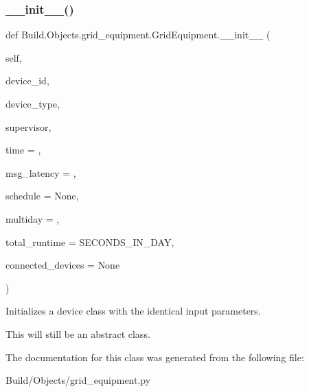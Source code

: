 \subsubsection{\texorpdfstring{\+\_\+\+\_\+init\+\_\+\+\_\+()}{\_\_init\_\_()}}
{\footnotesize\ttfamily def Build.\+Objects.\+grid\+\_\+equipment.\+Grid\+Equipment.\+\_\+\+\_\+init\+\_\+\+\_\+ (\begin{DoxyParamCaption}\item[{}]{self,  }\item[{}]{device\+\_\+id,  }\item[{}]{device\+\_\+type,  }\item[{}]{supervisor,  }\item[{}]{time = {},  }\item[{}]{msg\+\_\+latency = {},  }\item[{}]{schedule = {\ttfamily None},  }\item[{}]{multiday = {},  }\item[{}]{total\+\_\+runtime = {\ttfamily SECONDS\+\_\+IN\+\_\+DAY},  }\item[{}]{connected\+\_\+devices = {\ttfamily None} }\end{DoxyParamCaption})}



Initializes a device class with the identical input parameters. 

This will still be an abstract class. 

The documentation for this class was generated from the following file\+:\begin{DoxyCompactItemize}
\item 
Build/\+Objects/grid\+\_\+equipment.\+py\end{DoxyCompactItemize}
